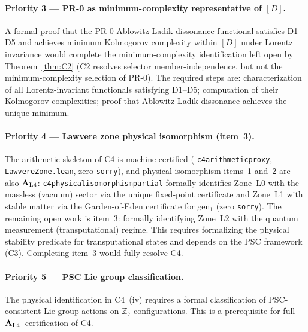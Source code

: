 \documentclass[12pt,letterpaper]{article}
\newcommand{\Zseven}{\mathbb{Z}_7}
\newcommand{\Dclass}{[D]}
\newcommand{\catAL}{\ensuremath{\textbf{A}_{\rm L4}}}
\newcommand{\lean}[1]{%
  \penalty-100
  \begingroup\def\_{\textunderscore\allowbreak}\texttt{#1}\endgroup}
\begin{document}
\paragraph{Priority 3 --- PR-0 as minimum-complexity representative of $\Dclass$.}
A formal proof that the PR-0 Ablowitz-Ladik dissonance functional satisfies D1--D5
and achieves minimum Kolmogorov complexity within $\Dclass$ under Lorentz
invariance would complete the minimum-complexity identification left open by
Theorem~\ref{thm:C2} (C2 resolves selector member-independence, but not the
minimum-complexity selection of PR-0).  The required steps are: characterization
of all Lorentz-invariant functionals satisfying D1--D5; computation of their
Kolmogorov complexities; proof that Ablowitz-Ladik dissonance achieves the unique
minimum.

\paragraph{Priority 4 --- Lawvere zone physical isomorphism (item~3).}
The arithmetic skeleton of C4 is machine-certified (\lean{c4\_arithmetic\_proxy},
\lean{LawvereZone.lean}, zero \texttt{sorry}), and physical isomorphism
items~1 and~2 are also \catAL: \lean{c4\_physical\_isomorphism\_partial}
formally identifies Zone~L0 with the massless (vacuum) sector via the unique
fixed-point certificate and Zone~L1 with stable matter via the Garden-of-Eden
certificate for gen$_1$ (zero \texttt{sorry}).  The remaining open work is
item~3: formally identifying Zone~L2 with the quantum measurement
(transputational) regime.  This requires formalizing the physical stability
predicate for transputational states and depends on the PSC framework (C3).
Completing item~3 would fully resolve C4.

\paragraph{Priority 5 --- PSC Lie group classification.}
The physical identification in C4~(iv) requires a formal classification of
PSC-consistent Lie group actions on $\Zseven$ configurations.  This is a
prerequisite for full \catAL\ certification of C4.
\end{document}
